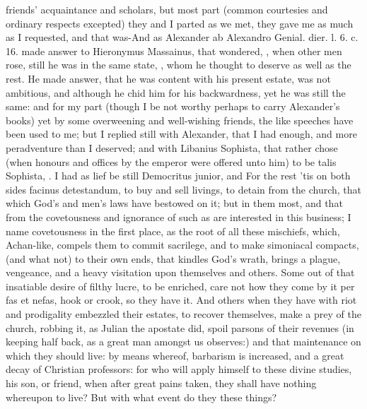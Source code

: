 {friends' acquaintance and scholars, but most part (common courtesies
and ordinary respects excepted) they and I parted as we met, they gave
me as much as I requested, and that was-And as Alexander ab Alexandro
Genial. dier. l. 6. c. 16. made answer to Hieronymus Massainus, that
wondered, , when other men rose, still he was in the
same state, , whom he thought to deserve as well as the rest. He made
answer, that he was content with his present estate, was not ambitious,
and although  he chid him
for his backwardness, yet he was still the same: and for my part
(though I be not worthy perhaps to carry Alexander's books) yet by some
overweening and well-wishing friends, the like speeches have been used
to me; but I replied still with Alexander, that I had enough, and more
peradventure than I deserved; and with Libanius Sophista, that rather
chose (when honours and offices by the emperor were offered unto him)
to be talis Sophista, . I had as lief be still
Democritus junior, and  For the rest
'tis on both sides facinus detestandum, to buy and sell livings, to
detain from the church, that which God's and men's laws have bestowed
on it; but in them most, and that from the covetousness and ignorance
of such as are interested in this business; I name covetousness in the
first place, as the root of all these mischiefs, which, Achan-like,
compels them to commit sacrilege, and to make simoniacal compacts, (and
what not) to their own ends, that kindles God's wrath, brings a
plague, vengeance, and a heavy visitation upon themselves and others.
Some out of that insatiable desire of filthy lucre, to be enriched,
care not how they come by it per fas et nefas, hook or crook, so they
have it. And others when they have with riot and prodigality embezzled
their estates, to recover themselves, make a prey of the church,
robbing it, as Julian the apostate did, spoil parsons of their
revenues (in keeping half back, as a great man amongst us
observes:) and that maintenance on which they should live: by means
whereof, barbarism is increased, and a great decay of Christian
professors: for who will apply himself to these divine studies, his
son, or friend, when after great pains taken, they shall have nothing
whereupon to live? But with what event do they these things?

}
